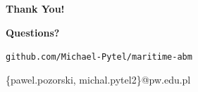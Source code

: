 \documentclass[aspectratio=169]{beamer}
\begin{document}
\begin{frame}[plain]
    \centering
    \vspace{1.8cm}
    {\Huge \textbf{Thank You!}}

    \vspace{1.2em}
    \large \textbf{Questions?}

    \vspace{1.4em}
    \normalsize
    \texttt{github.com/Michael-Pytel/maritime-abm}

    \vspace{0.8em}
    \small \{pawel.pozorski, michal.pytel2\}@pw.edu.pl
\end{frame}
\end{document}
